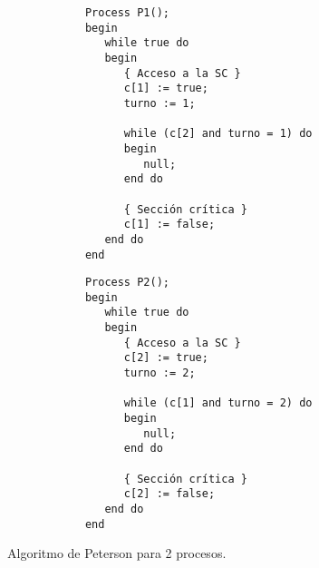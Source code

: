 \begin{figure}[H]
    \centering
    \setlength{\columnsep}{1cm}
    \begin{multicols}{2}
        \begin{verbatim}
            Process P1();
            begin
               while true do
               begin
                  { Acceso a la SC }
                  c[1] := true;
                  turno := 1;

                  while (c[2] and turno = 1) do
                  begin
                     null;
                  end do

                  { Sección crítica }
                  c[1] := false;
               end do
            end
        \end{verbatim}
        \begin{verbatim}
            Process P2();
            begin
               while true do
               begin
                  { Acceso a la SC }
                  c[2] := true;
                  turno := 2;

                  while (c[1] and turno = 2) do
                  begin
                     null;
                  end do

                  { Sección crítica }
                  c[2] := false;
               end do
            end
        \end{verbatim}
    \end{multicols}
    \caption{Algoritmo de Peterson para 2 procesos.}
\end{figure}

